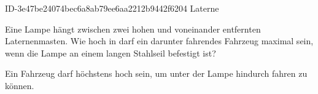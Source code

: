 \begin{exercise}
      {ID-3e47be24074bec6a8ab79ee6aa2212b9442f6204}
      {Laterne}
  \ifproblem\problem\par
    Eine Lampe hängt zwischen zwei  hohen und  voneinander
    entfernten Laternenmasten. Wie hoch in darf ein darunter fahrendes Fahrzeug
    maximal sein, wenn die Lampe an einem  langen Stahlseil
    befestigt ist?
  \fi
  \ifoutcome\outcome\par
    Ein Fahrzeug darf höchstens  hoch sein,
    um unter der Lampe hindurch fahren zu können.
  \fi
\end{exercise}
